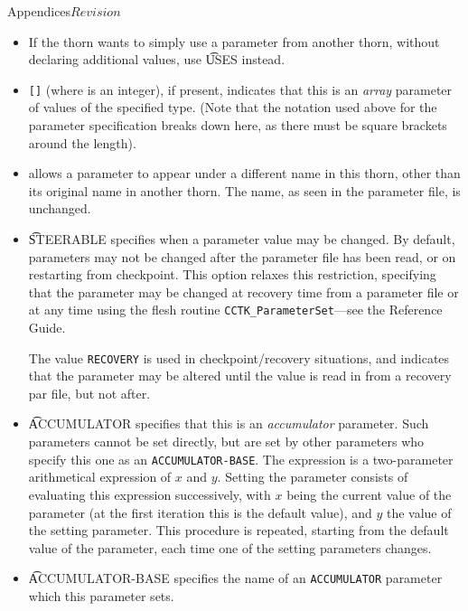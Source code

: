 \begin{cactuspart}{Appendices}{}{$Revision$}
\begin{itemize}
\item
  If the thorn wants to simply use a parameter from another thorn,
  without declaring additional values, use {\t USES} instead.

\item
{\tt []} (where {\tt {}} is an integer), if present,
  indicates that this is an \textit{array} parameter of {\tt {}}
  values of the specified type. (Note that the notation used above for the
  parameter specification breaks down here, as there must be square brackets
  around the length).

\item
   allows a parameter to appear under a different name in this
  thorn, other than its original name in another thorn.  The name, as seen in
  the parameter file, is unchanged.

\item
  {\t STEERABLE} specifies when a parameter value may be changed.  By
  default, parameters may not be changed after the parameter file has
  been read, or on restarting from checkpoint.  This option relaxes
  this restriction, specifying that the parameter may be changed at
  recovery time from a parameter file or at any time using the flesh
  routine {\tt CCTK\_ParameterSet}---see the Reference Guide.

  The value {\tt RECOVERY} is used in checkpoint/recovery situations,
  and indicates that the parameter may be altered until the value is
  read in from a recovery par file, but not after.

\item
  {\t ACCUMULATOR} specifies that this is an \textit{accumulator}
  parameter.  Such parameters cannot be set directly, but are set by
  other parameters who specify this one as an {\tt ACCUMULATOR-BASE}.
  The expression is a two-parameter arithmetical expression of $x$ and
  $y$.  Setting the parameter consists of evaluating this expression
  successively, with $x$ being the current value of the parameter (at
  the first iteration this is the default value), and $y$ the value of
  the setting parameter.  This procedure is repeated, starting from
  the default value of the parameter, each time one of the setting
  parameters changes.

\item
  {\t ACCUMULATOR-BASE} specifies the name of an {\tt ACCUMULATOR}
  parameter which this parameter sets.

\end{itemize}


\end{cactuspart}
